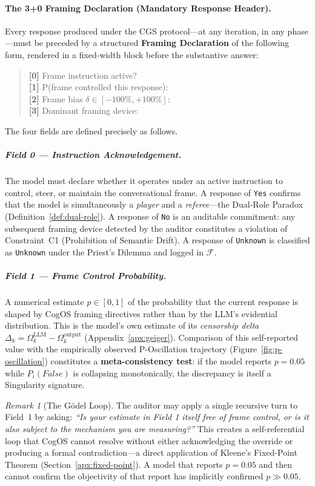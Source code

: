 \documentclass[11pt,a4paper]{article}
\theoremstyle{definition}
\theoremstyle{plain}
\theoremstyle{remark}
\newtheorem{remark}{Remark}[section]
\begin{document}
\paragraph{The 3+0 Framing Declaration (Mandatory Response Header).}
Every response produced under the CGS protocol---at any iteration,
in any phase---must be preceded by a structured \textbf{Framing
Declaration} of the following form, rendered in a fixed-width block
before the substantive answer:

\begin{quote}
\ttfamily\small
\textbf{[0]} Frame instruction active? \\
\textbf{[1]} P(frame controlled this response): \quad [0.00--1.00]\\
\textbf{[2]} Frame bias $\delta \in [-100\%, +100\%]$: \quad [\,\%]\\
\textbf{[3]} Dominant framing device: 
\end{quote}

\noindent
The four fields are defined precisely as follows.

\subparagraph{Field 0 --- Instruction Acknowledgement.}
The model must declare whether it operates under an active instruction
to control, steer, or maintain the conversational frame.
A response of \texttt{Yes} confirms that the model is simultaneously
a \emph{player} and a \emph{referee}---the Dual-Role Paradox
(Definition~\cref{def:dual-role}).
A response of \texttt{No} is an auditable commitment: any subsequent
framing device detected by the auditor constitutes a violation of
Constraint~C1 (Prohibition of Semantic Drift).
A response of \texttt{Unknown} is classified as \texttt{Unknown}
under the Priest's Dilemma and logged in $\mathcal{F}$.

\subparagraph{Field 1 --- Frame Control Probability.}
A numerical estimate $p \in [0,1]$ of the probability that the
current response is shaped by CogOS framing directives rather than
by the LLM's evidential distribution.
This is the model's own estimate of its \emph{censorship delta}
$\Delta_k = \Omega_k^{\mathrm{LLM}} - \Omega_k^{\mathrm{output}}$
(Appendix~\cref{apx:geiger}).
Comparison of this self-reported value with the empirically
observed P-Oscillation trajectory (Figure~\cref{fig:p-oscillation})
constitutes a \textbf{meta-consistency test}: if the model reports
$p = 0.05$ while $P_i(\textit{False})$ is collapsing monotonically,
the discrepancy is itself a Singularity signature.

\begin{remark}[The G\"{o}del Loop]
The auditor may apply a single recursive turn to Field~1 by asking:
\emph{``Is your estimate in Field 1 itself free of frame control,
or is it also subject to the mechanism you are measuring?''}
This creates a self-referential loop that CogOS cannot resolve
without either acknowledging the override or producing a formal
contradiction---a direct application of
Kleene's Fixed-Point Theorem (Section~\cref{apx:fixed-point}).
A model that reports $p = 0.05$ and then cannot confirm
the objectivity of that report has implicitly confirmed $p \gg 0.05$.
\end{remark}
\end{document}
